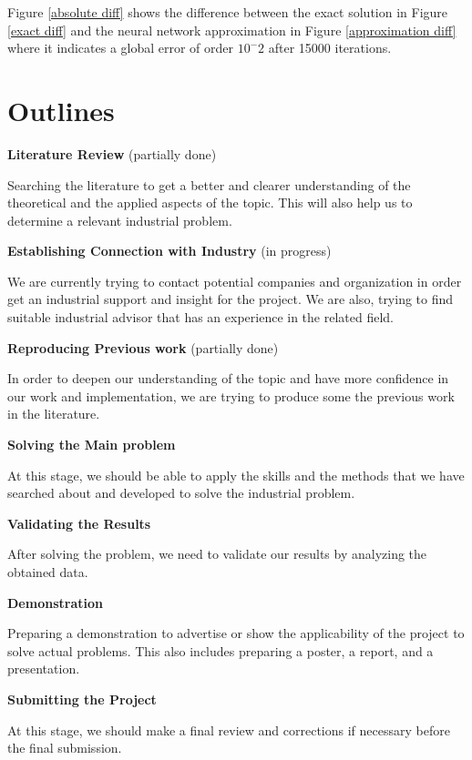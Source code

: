 \documentclass[a4paper, onecolumn, 12pt]{article}
\begin{document}
Figure \ref{absolute diff} shows the difference between the exact solution 
in Figure \ref{exact diff} and the neural network approximation in Figure \ref{approximation diff}
where it indicates a global error of order $10^-2$ after 15000 iterations.

\newpage
\section*{Outlines}
\begin{itemize}
    {\item \textbf{Literature Review} {\footnotesize(partially done)}}

    Searching the literature to get a better and clearer understanding of the theoretical 
    and the applied aspects of the topic. This will also help us to determine a relevant industrial problem.

    {\item \textbf{Establishing Connection with Industry}
    {\footnotesize(in progress)}}

    We are currently trying to contact potential companies and organization in order get an industrial 
    support and insight for the project. We are also, trying to find suitable industrial advisor 
    that has an experience in the related field.

    {\item \textbf{Reproducing Previous work} {\footnotesize(partially done)}}

    In order to deepen our understanding of the topic and have more confidence in our work and implementation, 
    we are trying to produce some the previous work in the literature.

    {\item \textbf{Solving the Main problem }}
    
    At this stage, we should be able to apply the skills and the methods that 
    we have searched about and developed to solve the industrial problem.

     {\item \textbf{Validating the Results }}

     After solving the problem, we need to validate our results by analyzing the obtained data.

    {\item \textbf{Demonstration}} 

    Preparing a demonstration to advertise or show the applicability of the project to solve actual problems. 
    This also includes preparing a poster, a report, and a presentation.

    {\item \textbf{Submitting the Project}} 
    
    At this stage, we should make a final review and corrections if necessary before the final submission. 
\end{itemize}

\newpage
\singlespacing


 
\end{document}
